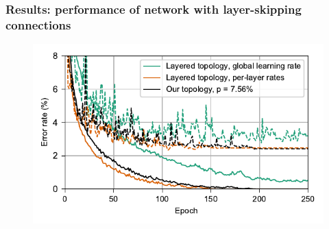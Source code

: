 \documentclass[pdf]{beamer}
\begin{document}
\begin{frame}
	\frametitle{Results: performance of network with layer-skipping connections}
	\begin{figure}
		\includegraphics[width=\textwidth]{figures/performance_original+global+ours.pdf}
	\end{figure}
\end{frame}
\end{document}
